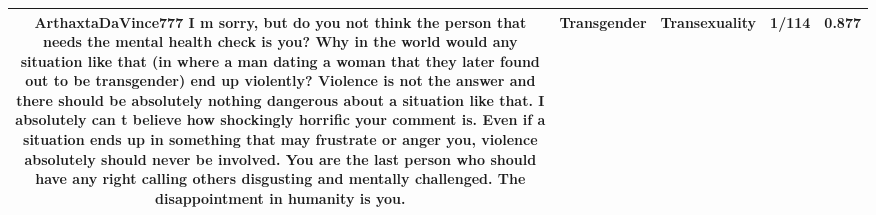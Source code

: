\documentclass[11pt]{article}
\newlength\mylength
\begin{document}
\begin{center}
\begin{longtable}{|C{.40\mylength}|C{.30\mylength}|C{.15\mylength}|C{.15\mylength}|C{.15\mylength}|}
  ArthaxtaDaVince777 I m sorry, but do you not think the person that needs the mental health check is you? Why in the world would any situation like that (in where a man dating a woman that they later found out to be transgender) end up violently? Violence is not the answer  and there should be absolutely nothing dangerous about a situation like that. I absolutely can t believe how shockingly horrific your comment is. Even if a situation ends up in something that may frustrate or anger you, violence absolutely should never be involved. You are the last person who should have any right calling others disgusting and mentally challenged. The disappointment in humanity is you.  & Transgender & Transexuality & 1/114 & 0.877 \\  \hline

\end{longtable}
\end{center}
\end{document}
